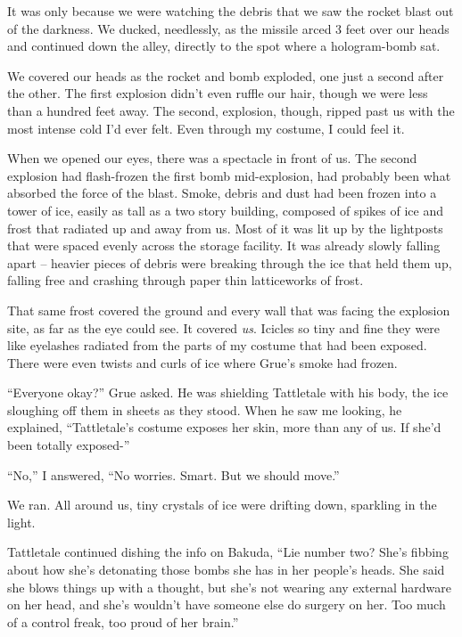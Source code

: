 It was only because we were watching the debris that we saw the rocket blast out of the darkness.  We ducked, needlessly, as the missile arced 3 feet over our heads and continued down the alley, directly to the spot where a hologram-bomb sat.



We covered our heads as the rocket and bomb exploded, one just a second after the other.  The first explosion didn't even ruffle our hair, though we were less than a hundred feet away.  The second, explosion, though, ripped past us with the most intense cold I'd ever felt.  Even through my costume, I could feel it.



When we opened our eyes, there was a spectacle in front of us.  The second explosion had flash-frozen the first bomb mid-explosion, had probably been what absorbed the force of the blast.  Smoke, debris and dust had been frozen into a tower of ice, easily as tall as a two story building, composed of spikes of ice and frost that radiated up and away from us.  Most of it was lit up by the lightposts that were spaced evenly across the storage facility.  It was already slowly falling apart – heavier pieces of debris were breaking through the ice that held them up, falling free and crashing through paper thin latticeworks of frost.



That same frost covered the ground and every wall that was facing the explosion site, as far as the eye could see.  It covered \emph{us}.  Icicles so tiny and fine they were like eyelashes radiated from the parts of my costume that had been exposed.  There were even twists and curls of ice where Grue's smoke had frozen.



``Everyone okay?'' Grue asked.  He was shielding Tattletale with his body, the ice sloughing off them in sheets as they stood.  When he saw me looking, he explained, ``Tattletale's costume exposes her skin, more than any of us.  If she'd been totally exposed-''



``No,'' I answered, ``No worries.  Smart.  But we should move.''



We ran.  All around us, tiny crystals of ice were drifting down, sparkling in the light.



Tattletale continued dishing the info on Bakuda, ``Lie number two?  She's fibbing about how she's detonating those bombs she has in her people's heads.  She said she blows things up with a thought, but she's not wearing any external hardware on her head, and she's  wouldn't have someone else do surgery on her.  Too much of a control freak, too proud of her brain.''



